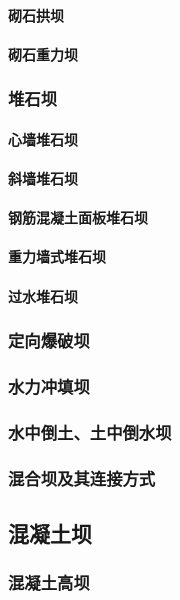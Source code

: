 \documentclass[UTF8]{../../ApplicationUniverse}
\begin{document}
            \paragraph{砌石拱坝}
            \paragraph{砌石重力坝}
        \subsubsection{堆石坝}
            \paragraph{心墙堆石坝}
            \paragraph{斜墙堆石坝}
            \paragraph{钢筋混凝土面板堆石坝}
            \paragraph{重力墙式堆石坝}
            \paragraph{过水堆石坝}
        \subsubsection{定向爆破坝}
        \subsubsection{水力冲填坝}
        \subsubsection{水中倒土、土中倒水坝}
        \subsubsection{混合坝及其连接方式}
    \subsection{混凝土坝}
        \subsubsection{混凝土高坝}
\end{document}
